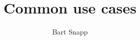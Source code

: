 \documentclass{ximera}
\title{Common use cases}
\author{Bart Snapp}
\begin{document}
\begin{abstract}
\end{abstract}
\maketitle
\end{document}
